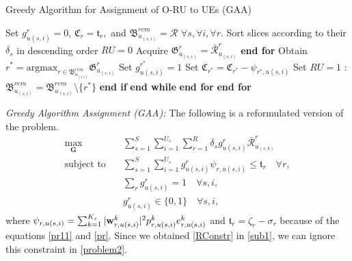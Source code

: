 \documentclass[lettersize,journal]{IEEEtran}
\begin{document}
\begin{algorithm}[t!]
\small
\caption{Greedy Algorithm for Assignment of O-RU to UEs (GAA)}\label{alg1}
\begin{algorithmic}[1]
\State Set $g^r_{u(s,i)} = 0$, $\mathfrak{C}_r = \mathfrak{t}_r,$ and ${\mathfrak{B}}^{rem}_{u_{(s,i)}} = \mathcal{R}$   $\forall s, \forall i, \forall r$.\label{31}
\State Sort slices according to their $\delta_s$ in descending order
\label{33}
\State $RU = 0$
\State Acquire $\mathfrak{G}^r_{u_{(s,i)}} = \bar{\mathcal{R}}^r_{u_{(s,i)}}$
\EndFor
\State \textbf{end for}
\State Obtain $r^* = \text{argmax}_{r\in{\mathfrak{B}}^{rem}_{u_{(s,i)}}} \mathfrak{G}^r_{u_{(s,i)}}$
\State Set $g^{r^*}_{u(s,i)} = 1$
\State Set  $\mathfrak{C}_{r^*} = \mathfrak{C}_{r^*} - \psi_{{r^*},u(s,i)}$
\State Set $RU = 1$
\Else: ${\mathfrak{B}}^{rem}_{u_{(s,i)}} = {\mathfrak{B}}^{rem}_{u_{(s,i)}} \setminus \{{r^*}\} $ 
\EndIf
\State \textbf{end if}
\EndWhile
\State \textbf{end while}
\EndFor
\State \textbf{end for}
\EndFor
\State \textbf{end for} \label{34}
\end{algorithmic}
\end{algorithm}
%
\textit{Greedy Algorithm Assignment (GAA):}
The following is a reformulated version of the problem.
\begin{subequations}\label{problem2}
\begin{alignat}{4}
\max\limits_{ \boldsymbol{G} }   \quad &  \sum_{s=1}^S\sum_{i=1}^{U_s}\sum_{r=1}^{R} \delta_s g^r_{u(s,i)}\bar{\mathcal{R}}^r_{u_{(s,k)}} \ \\
\text{subject to} \quad  & \sum_{s=1}^{S}\sum_{i=1}^{U_s} g_{u(s,i)}^r \psi_{r,u(s,i)}\leq \mathfrak{t}_r \quad \forall r,
 \label{p11} \\
& \sum_{r}g^r_{u(s,i)} = 1  \quad \forall s, i, \label{p12}\\
 & g^r_{u(s,i)} \in \{0,1\} \quad \forall s, i, \label{p13}
\end{alignat}
\end{subequations}
where $ \psi_{r,u(s,i)}=\sum_{k=1}^{K_s}|\bold{w}_{r,u(s,i)}^{k}|^2 p_{r,u(s,i)}^{k}  e^k_{r,u(s,i)}$
and $\mathfrak{t}_r = \zeta_r- \sigma_r$  because of the equations \eqref{pr11} and \eqref{pr}.
Since we obtained \eqref{RConstr} in \eqref{sub1}, we can ignore this constraint in \eqref{problem2}.
\end{document}
